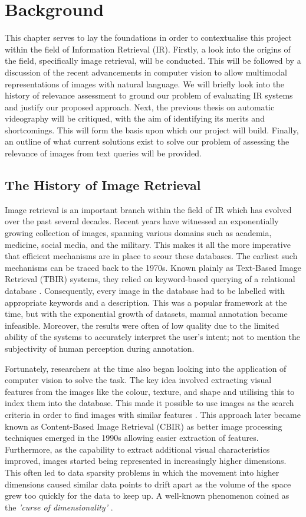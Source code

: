 \documentclass{l4proj}
\begin{document}
\chapter{Background}
This chapter serves to lay the foundations in order to contextualise this project within the field of Information Retrieval (IR). Firstly, a look into the origins of the field, specifically image retrieval, will be conducted. This will be followed by a discussion of the recent advancements in computer vision to allow multimodal representations of images with natural language. We will briefly look into the history of relevance assessment to ground our problem of evaluating IR systems and justify our proposed approach. Next, the previous thesis on automatic videography will be critiqued, with the aim of identifying its merits and shortcomings. This will form the basis upon which our project will build. Finally, an outline of what current solutions exist to solve our problem of assessing the relevance of images from text queries will be provided.

\section{The History of Image Retrieval}
Image retrieval is an important branch within the field of IR which has evolved over the past several decades. Recent years have witnessed an exponentially growing collection of images, spanning various domains such as academia, medicine, social media, and the military. This makes it all the more imperative that efficient mechanisms are in place to scour these databases. The earliest such mechanisms can be traced back to the 1970s. Known plainly as Text-Based Image Retrieval (TBIR) systems, they relied on keyword-based querying of a relational database \citep{chang1979tbir}. Consequently, every image in the database had to be labelled with appropriate keywords and a description. This was a popular framework at the time, but with the exponential growth of datasets, manual annotation became infeasible. Moreover, the results were often of low quality due to the limited ability of the systems to accurately interpret the user's intent; not to mention the subjectivity of human perception during annotation.

Fortunately, researchers at the time also began looking into the application of computer vision to solve the task. The key idea involved extracting visual features from the images like the colour, texture, and shape and utilising this to index them into the database. This made it possible to use images as the search criteria in order to find images with similar features \citep{chang1981pictorial}. This approach later became known as Content-Based Image Retrieval (CBIR) as better image processing techniques emerged in the 1990s allowing easier extraction of features. Furthermore, as the capability to extract additional visual characteristics improved, images started being represented in increasingly higher dimensions. This often led to data sparsity problems in which the movement into higher dimensions caused similar data points to drift apart as the volume of the space grew too quickly for the data to keep up. A well-known phenomenon coined as the \emph{'curse of dimensionality'} \citep{bellman1957dp}.
\end{document}
